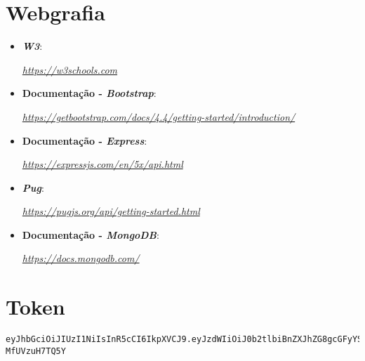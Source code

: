 \documentclass[a4paper]{report}
\begin{document}
\chapter{Webgrafia}
	\begin{itemize}
		\item \textbf{\textit{W3}}:
		\par \textit{\url{https://w3schools.com}}
        \item \textbf{Documentação - \textit{Bootstrap}}:
		\par \textit{\url{https://getbootstrap.com/docs/4.4/getting-started/introduction/}}
		\item \textbf{Documentação - \textit{Express}}:
		\par \textit{\url{https://expressjs.com/en/5x/api.html}}
        \item \textbf{\textit{Pug}}:
		\par \textit{\url{https://pugjs.org/api/getting-started.html}}
        \item \textbf{Documentação - \textit{MongoDB}}:
		\par \textit{\url{https://docs.mongodb.com/}}
    \end{itemize}


\appendix
\chapter{Token}

\begin{lstlisting}[breaklines]
    eyJhbGciOiJIUzI1NiIsInR5cCI6IkpXVCJ9.eyJzdWIiOiJ0b2tlbiBnZXJhZG8gcGFyYSBhIGxpdmUgZGVtbyIsImlhdCI6MTU4MDIwOTkwMn0.YXxS90uxAuBbRYXM65Mzjes_V8kEBW-MfUVzuH7TQ5Y
\end{lstlisting}
\end{document}
